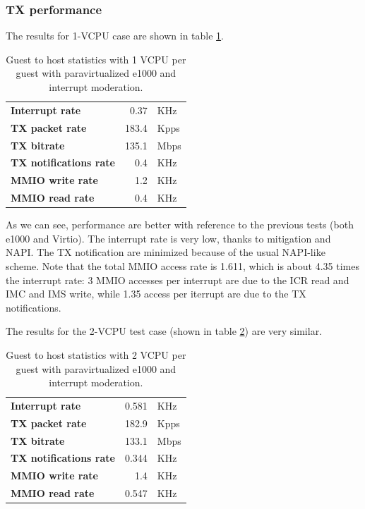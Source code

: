 \subsubsection{TX performance}
The results for 1-VCPU case are shown in table \ref{tab:e1000-par-tx-g2h1vcpu}.
\begin{table}
\begin{center}
\begin{tabular}{lrl}
\toprule
\textbf{Interrupt rate} & 0.37 & KHz\\
\textbf{TX packet rate} & 183.4 & Kpps\\
\textbf{TX bitrate} & 135.1 & Mbps\\
\textbf{TX notifications rate} & 0.4 & KHz\\
\textbf{MMIO write rate} & 1.2 & KHz\\
\textbf{MMIO read rate} & 0.4 & KHz\\
\bottomrule
\end{tabular}
\end{center}
\caption{Guest to host statistics with 1 VCPU per guest with paravirtualized e1000 and interrupt moderation.}
\label{tab:e1000-par-tx-g2h1vcpu}
\end{table}

As we can see, performance are better with reference to the previous tests (both e1000 and Virtio). The interrupt rate is very low,
thanks to mitigation and NAPI. The TX notification are minimized because of the usual NAPI-like scheme.
Note that the total MMIO access rate is 1.611, which is about 4.35 times the interrupt rate: 3 MMIO accesses per interrupt are due
to the ICR read and IMC and IMS write, while 1.35 access per iterrupt are due to the TX notifications.

\vspace{0.5cm}

The results for the 2-VCPU test case (shown in table \ref{tab:e1000-par-tx-g2h2vcpu}) are very similar.
\begin{table}
\begin{center}
\begin{tabular}{lrl}
\toprule
\textbf{Interrupt rate} & 0.581 & KHz\\
\textbf{TX packet rate} & 182.9 & Kpps\\
\textbf{TX bitrate} & 133.1 & Mbps\\
\textbf{TX notifications rate} & 0.344 & KHz\\
\textbf{MMIO write rate} & 1.4 & KHz\\
\textbf{MMIO read rate} & 0.547 & KHz\\
\bottomrule
\end{tabular}
\end{center}
\caption{Guest to host statistics with 2 VCPU per guest with paravirtualized e1000 and interrupt moderation.}
\label{tab:e1000-par-tx-g2h2vcpu}
\end{table}


